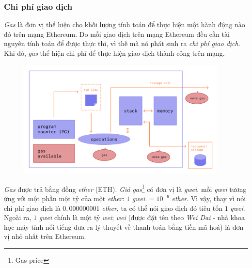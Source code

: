 \subsubsection*{Chi phí giao dịch}

\textit{Gas} là đơn vị thể hiện cho khối lượng tính toán để thực hiện một hành động nào đó trên mạng Ethereum. Do mỗi giao dịch trên mạng Ethereum đều cần tài nguyên tính toán để được thực thi, vì thế mà nó phát sinh ra \textit{chi phí giao dịch}. Khi đó, \textit{gas} thể hiện chi phí để thực hiện giao dịch thành công trên mạng.\\

\begin{figure}[ht]
    \centering
    \includegraphics[width=400px]{anh/chuoi-khoi/ethereum-gas.png}
\end{figure}

\textit{Gas} được trả bằng đồng \textit{ether} (ETH). \textit{Giá gas}\footnote{Gas price} có đơn vị là \textit{gwei}, mỗi \textit{gwei} tương ứng với một phần một tỷ của một \textit{ether}: $1$ \textit{gwei} $=10^{-9}$ \textit{ether}. Vì vậy, thay vì nói chi phí giao dịch là $0,000000001$ \textit{ether}, ta có thể nói giao dịch đó tiêu tốn $1$ \textit{gwei}. Ngoài ra, $1$ \textit{gwei} chính là một tỷ \textit{wei}; \textit{wei} (được đặt tên theo \textit{Wei Dai} - nhà khoa học máy tính nổi tiếng đưa ra lý thuyết về thanh toán bằng tiền mã hoá) là đơn vị nhỏ nhất trên Ethereum.\\

